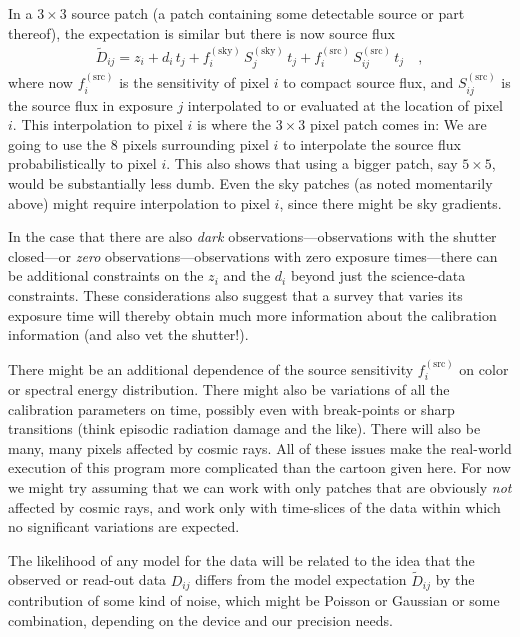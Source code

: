 \documentclass[12pt,preprint,dvips]{aastex}
\newcommand{\expectation}[1]{\tilde{#1}}
\newcommand{\sky}{^{(\mathrm{sky})}}
\newcommand{\source}{^{(\mathrm{src})}}
\begin{document}
In a $3\times 3$ source patch (a patch containing some detectable
source or part thereof), the expectation is similar but there is now
source flux
\begin{eqnarray}
\expectation{D}_{ij} = z_i + d_i\,t_j + f\sky_i\,S\sky_j\,t_j
                     + f\source_i\,S\source_{ij}\,t_j
\quad ,
\end{eqnarray}
where now $f\source_i$ is the sensitivity of pixel $i$ to compact
source flux, and $S\source_{ij}$ is the source flux in exposure $j$
interpolated to or evaluated at the location of pixel $i$.  This
interpolation to pixel $i$ is where the $3\times 3$ pixel patch comes
in: We are going to use the 8 pixels surrounding pixel $i$ to
interpolate the source flux probabilistically to pixel $i$.  This also
shows that using a bigger patch, say $5\times 5$, would be
substantially less dumb.  Even the sky patches (as noted momentarily
above) might require interpolation to pixel $i$, since there might be
sky gradients.

In the case that there are also \emph{dark}
observations---observations with the shutter closed---or \emph{zero}
observations---observations with zero exposure times---there can be
additional constraints on the $z_i$ and the $d_i$ beyond just the
science-data constraints.  These considerations also suggest that a
survey that varies its exposure time will thereby obtain much more
information about the calibration information (and also vet the
shutter!).

There might be an additional dependence of the source sensitivity
$f\source_i$ on color or spectral energy distribution.  There might
also be variations of all the calibration parameters on time, possibly
even with break-points or sharp transitions (think episodic radiation
damage and the like).  There will also be many, many pixels affected
by cosmic rays.  All of these issues make the real-world execution of
this program more complicated than the cartoon given here.  For now we
might try assuming that we can work with only patches that are
obviously \emph{not} affected by cosmic rays, and work only with
time-slices of the data within which no significant variations are
expected.

The likelihood of any model for the data will be related to the idea
that the observed or read-out data $D_{ij}$ differs from the model
expectation $\expectation{D}_{ij}$ by the contribution of some kind of
noise, which might be Poisson or Gaussian or some combination,
depending on the device and our precision needs.
\end{document}
